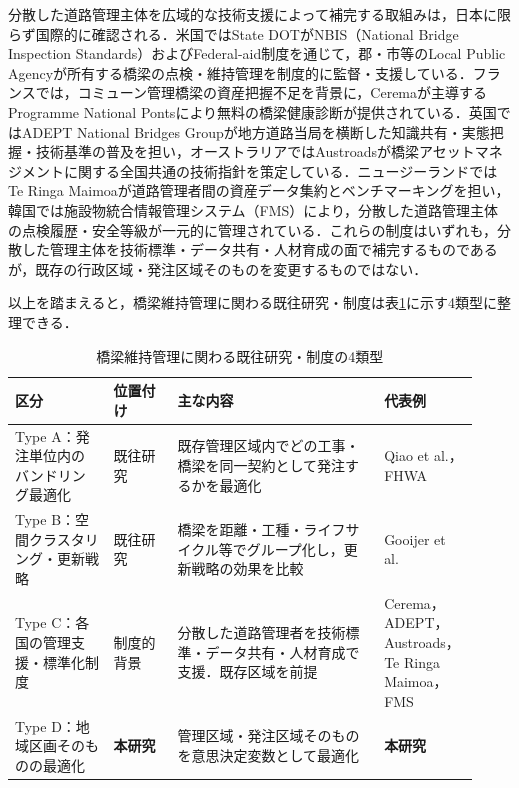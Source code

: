 \documentclass[Journal,letterpaper,InsideFigs,NoLineNumbers]{ascelike-new}
\begin{document}
分散した道路管理主体を広域的な技術支援によって補完する取組みは，日本に限らず国際的に確認される．米国ではState DOTがNBIS（National Bridge Inspection Standards）およびFederal-aid制度を通じて，郡・市等のLocal Public Agencyが所有する橋梁の点検・維持管理を制度的に監督・支援している\cite{fhwa2019}．フランスでは，コミューン管理橋梁の資産把握不足を背景に，Ceremaが主導するProgramme National Pontsにより無料の橋梁健康診断が提供されている\cite{cerema2024}．英国ではADEPT National Bridges Groupが地方道路当局を横断した知識共有・実態把握・技術基準の普及を担い\cite{adeptnbg}，オーストラリアではAustroadsが橋梁アセットマネジメントに関する全国共通の技術指針を策定している\cite{austroads2021}．ニュージーランドではTe Ringa Maimoaが道路管理者間の資産データ集約とベンチマーキングを担い\cite{teringamaimoa}，韓国では施設物統合情報管理システム（FMS）により，分散した道路管理主体の点検履歴・安全等級が一元的に管理されている\cite{koreafms}．これらの制度はいずれも，分散した管理主体を技術標準・データ共有・人材育成の面で補完するものであるが，既存の行政区域・発注区域そのものを変更するものではない．

以上を踏まえると，橋梁維持管理に関わる既往研究・制度は表\ref{tab:typology}に示す4類型に整理できる．

\begin{table}[h]
\centering
\caption{橋梁維持管理に関わる既往研究・制度の4類型}
\label{tab:typology}
\begin{tabular}{p{0.20\linewidth}p{0.13\linewidth}p{0.42\linewidth}p{0.17\linewidth}}
\toprule
区分 & 位置付け & 主な内容 & 代表例 \\
\midrule
Type A：発注単位内のバンドリング最適化 & 既往研究 & 既存管理区域内でどの工事・橋梁を同一契約として発注するかを最適化 & Qiao et al.\cite{qiao2026}，FHWA\cite{fhwa2019} \\
Type B：空間クラスタリング・更新戦略 & 既往研究 & 橋梁を距離・工種・ライフサイクル等でグループ化し，更新戦略の効果を比較 & Gooijer et al.\cite{gooijer2024} \\
Type C：各国の管理支援・標準化制度 & 制度的背景 & 分散した道路管理者を技術標準・データ共有・人材育成で支援．既存区域を前提 & Cerema，ADEPT，Austroads，Te Ringa Maimoa，FMS \\
Type D：地域区画そのものの最適化 & \textbf{本研究} & 管理区域・発注区域そのものを意思決定変数として最適化 & \textbf{本研究} \\
\bottomrule
\end{tabular}
\end{table}
\end{document}
